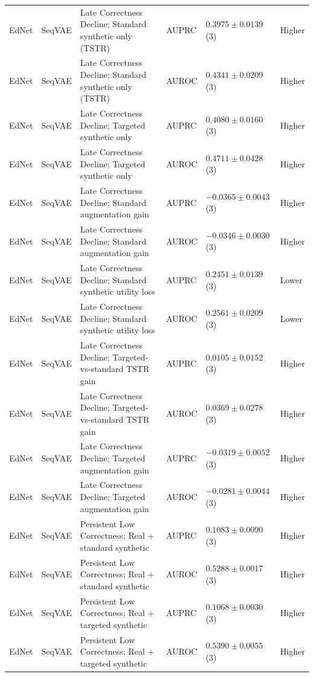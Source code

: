 \begin{longtable}{@{}p{2.25cm}p{2.05cm}p{4.7cm}p{5.0cm}p{2.6cm}p{1.25cm}@{}}
EdNet & SeqVAE & Late Correctness Decline; Standard synthetic only (TSTR) & AUPRC & $0.3975 \mathbin{\pm} 0.0139$ (3) & Higher \\
EdNet & SeqVAE & Late Correctness Decline; Standard synthetic only (TSTR) & AUROC & $0.4341 \mathbin{\pm} 0.0209$ (3) & Higher \\
EdNet & SeqVAE & Late Correctness Decline; Targeted synthetic only & AUPRC & $0.4080 \mathbin{\pm} 0.0160$ (3) & Higher \\
EdNet & SeqVAE & Late Correctness Decline; Targeted synthetic only & AUROC & $0.4711 \mathbin{\pm} 0.0428$ (3) & Higher \\
EdNet & SeqVAE & Late Correctness Decline; Standard augmentation gain & AUPRC & $-0.0365 \mathbin{\pm} 0.0043$ (3) & Higher \\
EdNet & SeqVAE & Late Correctness Decline; Standard augmentation gain & AUROC & $-0.0346 \mathbin{\pm} 0.0030$ (3) & Higher \\
EdNet & SeqVAE & Late Correctness Decline; Standard synthetic utility loss & AUPRC & $0.2451 \mathbin{\pm} 0.0139$ (3) & Lower \\
EdNet & SeqVAE & Late Correctness Decline; Standard synthetic utility loss & AUROC & $0.2561 \mathbin{\pm} 0.0209$ (3) & Lower \\
EdNet & SeqVAE & Late Correctness Decline; Targeted-vs-standard TSTR gain & AUPRC & $0.0105 \mathbin{\pm} 0.0152$ (3) & Higher \\
EdNet & SeqVAE & Late Correctness Decline; Targeted-vs-standard TSTR gain & AUROC & $0.0369 \mathbin{\pm} 0.0278$ (3) & Higher \\
EdNet & SeqVAE & Late Correctness Decline; Targeted augmentation gain & AUPRC & $-0.0319 \mathbin{\pm} 0.0052$ (3) & Higher \\
EdNet & SeqVAE & Late Correctness Decline; Targeted augmentation gain & AUROC & $-0.0281 \mathbin{\pm} 0.0044$ (3) & Higher \\
EdNet & SeqVAE & Persistent Low Correctness; Real + standard synthetic & AUPRC & $0.1083 \mathbin{\pm} 0.0090$ (3) & Higher \\
EdNet & SeqVAE & Persistent Low Correctness; Real + standard synthetic & AUROC & $0.5288 \mathbin{\pm} 0.0017$ (3) & Higher \\
EdNet & SeqVAE & Persistent Low Correctness; Real + targeted synthetic & AUPRC & $0.1068 \mathbin{\pm} 0.0030$ (3) & Higher \\
EdNet & SeqVAE & Persistent Low Correctness; Real + targeted synthetic & AUROC & $0.5390 \mathbin{\pm} 0.0055$ (3) & Higher \\

\end{longtable}
